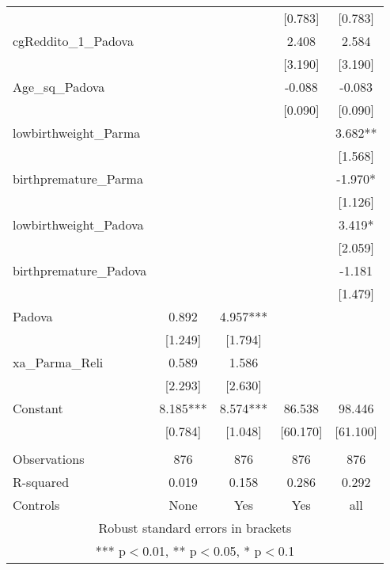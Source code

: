 \documentclass[]{article}
\begin{document}
\begin{tabular}{lcccc}
 &  &  & [0.783] & [0.783] \\
cgReddito\_1\_Padova &  &  & 2.408 & 2.584 \\
 &  &  & [3.190] & [3.190] \\
Age\_sq\_Padova &  &  & -0.088 & -0.083 \\
 &  &  & [0.090] & [0.090] \\
lowbirthweight\_Parma &  &  &  & 3.682** \\
 &  &  &  & [1.568] \\
birthpremature\_Parma &  &  &  & -1.970* \\
 &  &  &  & [1.126] \\
lowbirthweight\_Padova &  &  &  & 3.419* \\
 &  &  &  & [2.059] \\
birthpremature\_Padova &  &  &  & -1.181 \\
 &  &  &  & [1.479] \\
Padova & 0.892 & 4.957*** &  &  \\
 & [1.249] & [1.794] &  &  \\
xa\_Parma\_Reli & 0.589 & 1.586 &  &  \\
 & [2.293] & [2.630] &  &  \\
Constant & 8.185*** & 8.574*** & 86.538 & 98.446 \\
 & [0.784] & [1.048] & [60.170] & [61.100] \\
 &  &  &  &  \\
Observations & 876 & 876 & 876 & 876 \\
R-squared & 0.019 & 0.158 & 0.286 & 0.292 \\
 Controls & None & Yes & Yes & all \\ \hline
\multicolumn{5}{c}{ Robust standard errors in brackets} \\
\multicolumn{5}{c}{ *** p$<$0.01, ** p$<$0.05, * p$<$0.1} \\
\end{tabular}
\end{document}
